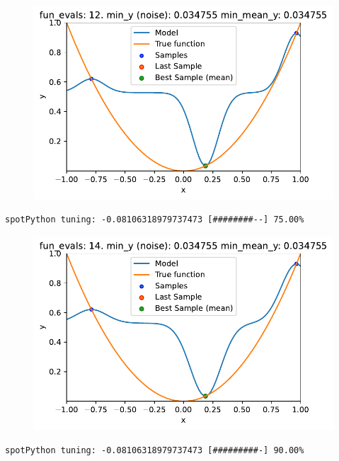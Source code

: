 \documentclass[
  letterpaper,
  DIV=11,
  numbers=noendperiod]{scrreprt}
\begin{document}
\begin{figure}[H]

{\centering \includegraphics{014_num_spot_ocba_files/figure-pdf/cell-6-output-6.pdf}

}

\end{figure}

\begin{verbatim}
spotPython tuning: -0.08106318979737473 [########--] 75.00% 
\end{verbatim}

\begin{figure}[H]

{\centering \includegraphics{014_num_spot_ocba_files/figure-pdf/cell-6-output-8.pdf}

}

\end{figure}

\begin{verbatim}
spotPython tuning: -0.08106318979737473 [#########-] 90.00% 
\end{verbatim}
\end{document}
